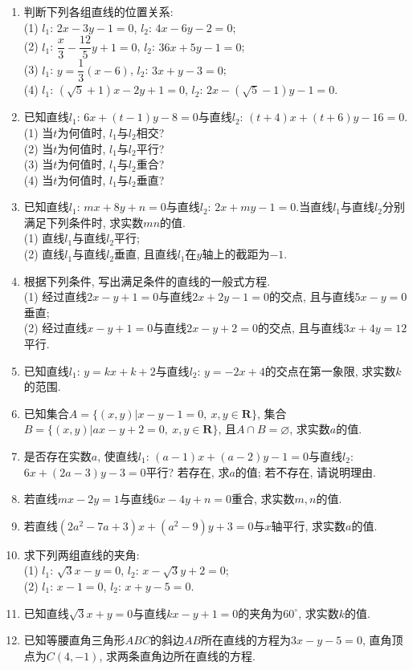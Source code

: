 \documentclass[10pt,a4paper]{article}
\begin{document}
\begin{enumerate}[1.]
\item 判断下列各组直线的位置关系:\\
(1) $l_1$: $2x-3y-1=0$, $l_2$: $4x-6y-2=0$;\\
(2) $l_1$: $\dfrac x3-\dfrac{12}5y+1=0$, $l_2$: $36x+5y-1=0$;\\
(3) $l_1$: $y=\dfrac 13(x-6)$, $l_2$: $3x+y-3=0$;\\
(4) $l_1$: $(\sqrt 5+1)x-2y+1=0$, $l_2$: $2x-(\sqrt 5-1)y-1=0$.
\item 已知直线$l_1$: $6x+(t-1)y-8=0$与直线$l_2$: $(t+4)x+(t+6)y-16=0$.\\
(1) 当$t$为何值时, $l_1$与$l_2$相交?\\
(2) 当$t$为何值时, $l_1$与$l_2$平行?\\
(3) 当$t$为何值时, $l_1$与$l_2$重合?\\
(4) 当$t$为何值时, $l_1$与$l_2$垂直?
\item 已知直线$l_1$: $mx+8y+n=0$与直线$l_2$: $2x+my-1=0$.当直线$l_1$与直线$l_2$分别满足下列条件时, 求实数$mn$的值.\\
(1) 直线$l_1$与直线$l_2$平行;\\
(2) 直线$l_1$与直线$l_2$垂直, 且直线$l_1$在$y$轴上的截距为$-1$.
\item 根据下列条件, 写出满足条件的直线的一般式方程.\\
(1) 经过直线$2x-y+1=0$与直线$2x+2y-1=0$的交点, 且与直线$5x-y=0$垂直;\\
(2) 经过直线$x-y+1=0$与直线$2x-y+2=0$的交点, 且与直线$3x+4y=12$平行.
\item 已知直线$l_1$: $y=kx+k+2$与直线$l_2$: $y=-2x+4$的交点在第一象限, 求实数$k$的范围.
\item 已知集合$A=\{(x,y)|x-y-1=0,\ x,y\in \mathbf{R}\}$, 集合$B=\{(x,y)|ax-y+2=0,\ x,y\in \mathbf{R}\}$, 且$A\cap B=\varnothing$, 求实数$a$的值.
\item 是否存在实数$a$, 使直线$l_1$: $(a-1)x+(a-2)y-1=0$与直线$l_2$: $6x+(2a-3)y-3=0$平行? 若存在, 求$a$的值; 若不存在, 请说明理由.
\item 若直线$mx-2y=1$与直线$6x-4y+n=0$重合, 求实数$m,n$的值.
\item 若直线$(2a^2-7a+3)x+(a^2-9)y+3=0$与$x$轴平行, 求实数$a$的值.
\item 求下列两组直线的夹角:\\
(1) $l_1$: $\sqrt 3x-y=0$, $l_2$: $x-\sqrt 3y+2=0$;\\
(2) $l_1$: $x-1=0$, $l_2$: $x+y-5=0$.
\item 已知直线$\sqrt 3x+y=0$与直线$kx-y+1=0$的夹角为$60^{\circ }$, 求实数$k$的值.
\item 已知等腰直角三角形$ABC$的斜边$AB$所在直线的方程为$3x-y-5=0$, 直角顶点为$C(4,-1)$, 求两条直角边所在直线的方程.

\end{enumerate}
\end{document}
